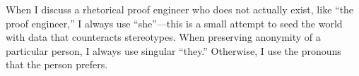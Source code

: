 When I discuss a rhetorical proof engineer who does not actually exist,
like ``the proof engineer,'' I always use ``she''---this is a small attempt
to seed the world with data that counteracts stereotypes. 
When preserving anonymity of a particular person, I always use singular ``they.''
Otherwise, I use the pronouns that the person prefers.



